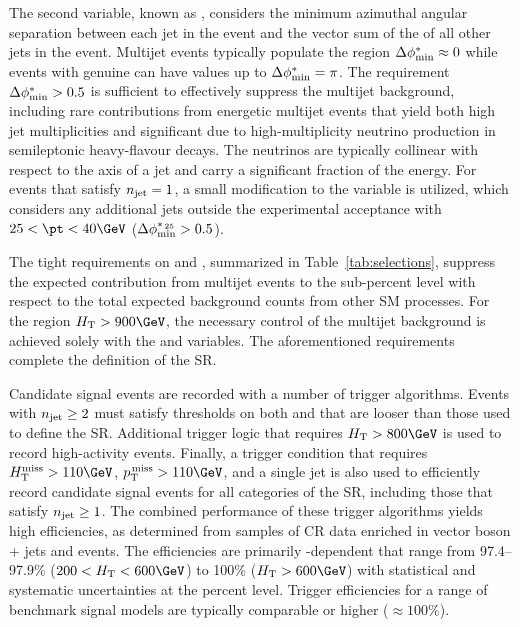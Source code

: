 The second variable, known as \bdphi, considers the minimum azimuthal
angular separation between each jet in the event and the vector sum of
the \pt of all other jets in the event. Multijet events typically
populate the region $\bdphi \approx 0$ while events with genuine
\ptvecmiss can have values up to $\bdphi = \pi$. The requirement
$\bdphi > 0.5$ is sufficient to effectively suppress the multijet
background, including rare contributions from energetic multijet
events that yield both high jet multiplicities and significant
\ptvecmiss due to high-multiplicity neutrino production in
semileptonic heavy-flavour decays. The neutrinos are typically
collinear with respect to the axis of a jet and carry a significant
fraction of the energy. For events that satisfy $\njet = 1$, a small
modification to the \bdphi variable is utilized, which considers any
additional jets outside the experimental acceptance with $25 < \pt <
40\GeV$ ($\bdphimod > 0.5$).

The tight requirements on \alphat and \bdphi, summarized in
Table~\ref{tab:selections}, suppress the expected contribution from
multijet events to the sub-percent level with respect to the total
expected background counts from other SM processes. For the region
$\scalht > 900\GeV$, the necessary control of the multijet background
is achieved solely with the \bdphi and \bdphimod variables. The
aforementioned requirements complete the definition of the SR.

Candidate signal events are recorded with a number of trigger
algorithms. Events with $\njet \geq 2$ must satisfy thresholds on both
\scalht and \alphat that are looser than those used to define the
SR. Additional trigger logic that requires $\scalht > 800\GeV$ is used
to record high-activity events. Finally, a trigger condition that
requires $\mht > 110\GeV$, $\ptmiss > 110\GeV$, and a single jet is
also used to efficiently record candidate signal events for all
categories of the SR, including those that satisfy $\njet \geq 1$. The
combined performance of these trigger algorithms yields high
efficiencies, as determined from samples of CR data enriched in vector
boson + jets and \ttbar events. The efficiencies are primarily
\scalht-dependent that range from 97.4--97.9\% ($200 < \scalht <
600\GeV$) to 100\% ($\scalht > 600\GeV$) with statistical and
systematic uncertainties at the percent level. Trigger efficiencies
for a range of benchmark signal models are typically comparable or
higher (${\approx}100\%$).


